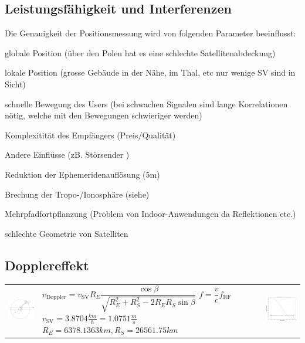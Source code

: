 \subsection{Leistungsfähigkeit und Interferenzen}
	Die Genauigkeit der Positionsmessung wird von folgenden Parameter beeinflusst:
	\begin{liste}
    	\item globale Position (über den Polen hat es eine schlechte
    	Satellitenabdeckung)
    	\item lokale Position (grosse Gebäude in der Nähe, im Thal, etc nur wenige
    	SV sind in Sicht)
    	\item schnelle Bewegung des Users (bei schwachen Signalen sind lange
    	Korrelationen nötig, welche mit den Bewegungen schwieriger werden)
    	\item Komplexitität des Empfängers (Preis/Qualität)
    	\item Andere Einflüsse (zB. Störsender )
    	\item Reduktion der Ephemeridenauflösung (5m)
    	\item Brechung der Tropo-/Ionosphäre (siehe)
    	\item Mehrpfadfortpflanzung (Problem von Indoor-Anwendungen da Reflektionen
    	etc.)
    	\item schlechte Geometrie von Satelliten
    \end{liste}

\subsection{Dopplereffekt }
\begin{tabular}{lll}
\parbox{5cm}{
    \includegraphics[width=5cm]{./bilder/gps-doppler-constellation.png}}
& \parbox{7cm}{
    $v_{\text{Doppler}} = v_{\text{SV}} R_E\dfrac{\cos \beta}{\sqrt{R_E^2+R_S^2
    -2R_ER_S \sin \beta }}$\\
    $f = \dfrac{v}{c} f_{\text{RF}}$ \\ \\
    $v_{\text{SV}} = 3.8704\frac{km}{h} = 1.0751\frac{m}{s}$ \\
    $R_E = 6378.1363km, R_S = 26561.75km$}
& \parbox{6cm}{
    \includegraphics[width=6cm]{./bilder/gps-doppler-speed.png}}
\end{tabular}

